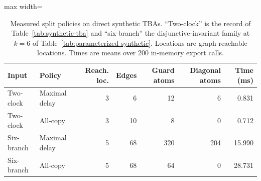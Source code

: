 \begin{table}[t]
\centering
\caption{Measured split policies on direct synthetic TBAs. ``Two-clock'' is the
 record of Table~\ref{tab:synthetic-tba}
and ``six-branch'' the disjunctive-invariant family at $k=6$ of
Table~\ref{tab:parameterized-synthetic}. Locations are graph-reachable
locations. Times are means over 200 in-memory export calls.}
\label{tab:split-comparison}
\scriptsize
\begin{adjustbox}{max width=\textwidth}\begin{tabular}{@{}llrrrrr@{}}
\toprule
Input & Policy & Reach. loc. & Edges & Guard atoms & Diagonal atoms & Time (ms)\\
\midrule
Two-clock & Maximal delay & 3 & 6 & 12 & 6 & 0.831\\
Two-clock & All-copy & 3 & 10 & 8 & 0 & 0.712\\
Six-branch & Maximal delay & 5 & 68 & 320 & 204 & 15.990\\
Six-branch & All-copy & 5 & 68 & 64 & 0 & 28.731\\
\bottomrule
\end{tabular}\end{adjustbox}
\end{table}

